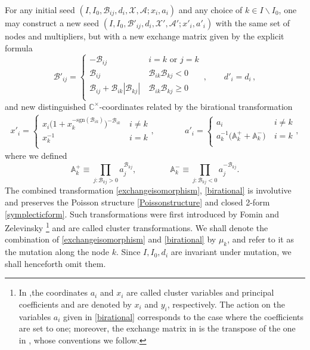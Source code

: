 \documentclass[12pt,reqno]{article}
\numberwithin{equation}{section}
\newcommand{\be}{\begin{equation}}
\newcommand{\ee}{\end{equation}}
\newcommand{\beq}{\begin{eqnarray}}
\newcommand{\eeq}{\end{eqnarray}}
\newcommand{\cA}{\mathcal{A}}
\newcommand{\cX}{\mathcal{X}}
\newcommand{\IC}{\mathbb{C}}
\newcommand{\exm}{\mathcal{B}}
\numberwithin{equation}{section}
\begin{document}
For any initial seed $(I,I_0,\exm_{ij}, d_i,\cX,\cA;x_i,a_i)$ and any choice of
$k\in I\backslash I_0$, one may construct a new seed $(I,I_0,\exm'_{ij},d_i,\cX',\cA';x'_i,a'_i)$
with the same set of nodes and multipliers, but with a new exchange matrix given by the explicit formula
\be
 \exm'_{ij} =  \left\{\begin{array}{cc}
- \exm_{ij}  &\ i=k \,\,  \text{or}\,\,   j=k
\\
 \exm_{ij}  & \ \exm_{ik}  \exm_{kj} < 0
\\
 \exm_{ij} + \exm_{ik} | \exm_{kj} | &\  \exm_{ik}  \exm_{kj} \geq 0
\\
\end{array}\right. \, ,
\qquad
d'_i=d_i\, ,
\label{exchangeisomorphism}
\ee
and new distinguished $\IC^\times$-coordinates related by the birational
transformation
\beq
x'_i=
\left\{ \begin{array}{cc}
x_i\big(1+x_k^{-\text{sgn}( \exm_{ik} )}\big)^{- \exm_{ik} } &\ i\neq k
\\
x_k^{-1} &\ i=k
\\
\end{array} \right. ,
&\qquad &
a'_i=   \left\{ \begin{array}{cc}
a_i &\ i\neq k
\\
a_k^{-1}\big(\mathbb{A}_k^{+}+ \mathbb{A}_k^{-}\big) &\ i=k
\\
\end{array}\right. ,
\label{birational}
\eeq
where we defined
\be
\mathbb{A}_k^{+} \equiv \prod_{j:  \exm_{kj} > 0} a_j^{ \exm_{kj} },
\qquad \qquad
\mathbb{A}_k^{-}\equiv \prod_{j:  \exm_{kj} < 0} a_j^{- \exm_{kj} }.
\label{fatA}
\ee
The combined transformation \eqref{exchangeisomorphism},
\eqref{birational} is involutive and preserves the Poisson structure \eqref{Poissonstructure}
and closed 2-form \eqref{symplecticform}. Such transformations were first
introduced by Fomin and Zelevinsky \cite{MR1887642,MR2295199}\footnote{
In \cite{MR1887642,MR2295199},the coordinates $a_i$ and $x_i$ are called cluster
variables and principal coefficients and are denoted by $x_i$ and $y_i$,
respectively. The action on the variables $a_i$ given in \eqref{birational}
corresponds to the case where the coefficients are set to one;
moreover, the exchange matrix in \cite{MR1887642,MR2295199} is the transpose of the
one in \cite{FG}, whose conventions we follow.} and are
 called cluster transformations. We shall denote the combination
of  \eqref{exchangeisomorphism} and \eqref{birational} by $\mu_k$, and refer
to it as the mutation along the node $k$. Since $I,I_0,d_i$ are invariant under
mutation, we shall henceforth omit them.
\end{document}
